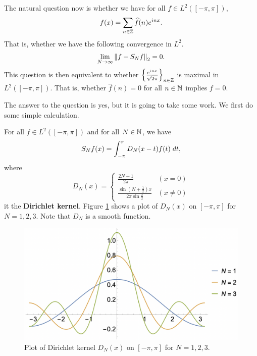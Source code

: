 \documentclass[a4paper]{article}
\begin{document}
The natural question now is whether we have for 
all $f \in L^2 ([-\pi, \pi])$, 
\[
f(x) = \sum_{n \in \mathbb{Z}} \widehat{f}(n) e^{i n x}.
\]
That is, whether we have the following convergence in $L^2$.
\[
\lim_{N \to \infty} \left\lVert f - S_N f\right\rVert_2 = 0.
\]
This question is then equivalent to whether 
$\left\{ \frac{e^{inx}}{\sqrt{2 \pi}} \right\}_{n \in \mathbb{Z}}$
is maximal in $L^2 ([-\pi, \pi])$. That is, 
whether $\hat{f}(n) = 0$ for all $n \in \mathbb{N}$ implies $f = 0$.

The answer to the question is yes, but it is going to take 
some work. We first do some simple calculation.

\begin{thm}
For all $f \in L^2([-\pi, \pi])$ and for all $N \in \mathbb{N}$, 
we have 
\[
S_N f(x) = \int_{- \pi}^\pi D_N(x - t) f(t) \; d t,
\]
where
\[
D_N(x) = \begin{cases}
  \frac{2N + 1}{2 \pi} & (x = 0) \\
  \frac{\sin \left( N + \frac{1}{2} \right) x}{2 \pi 
  \sin \frac{x}{2}} & (x \neq 0)
\end{cases}
\]
it the \textbf{Dirichlet kernel}. Figure \ref{dirichlet-kernel}
shows a plot of $D_N(x)$ on $[-\pi, \pi]$ for $N = 1,2,3$.
Note that $D_N$ is a smooth function. 
\end{thm}

\begin{figure}[h!]
  \centering
  \includegraphics[width=0.6\linewidth]{fig/dirichlet-kernel.png}
  \caption{Plot of Dirichlet kernel $D_N(x)$ on $[-\pi, \pi]$
  for $N = 1,2,3$.}
  \label{dirichlet-kernel}
\end{figure}
\end{document}
